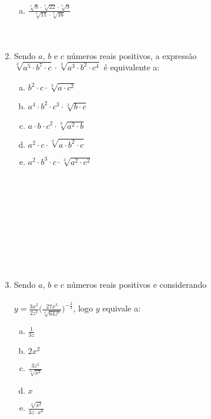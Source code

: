 \documentclass[a4paper,14pt]{article}
\begin{document}
\begin{multicols}{2}
\begin{enumerate}
\begin{enumerate}[a)]
        	\item $\frac{\sqrt[7]{8} \cdot \sqrt[7]{22} \cdot \sqrt[7]{9}}{\sqrt[7]{11} \cdot \sqrt[7]{16}}$\\\\\\
        \end{enumerate}
        \item Sendo $a$, $b$ e $c$ números reais positivos, a expressão\\ $\sqrt[3]{a^5 \cdot b^7 \cdot c} \cdot \sqrt[3]{a^3 \cdot b^2 \cdot c^4}$ é equivalente a:
        \begin{enumerate}[a)]
            \item $b^2 \cdot c \cdot \sqrt[3]{a \cdot c^2}$
            \item $a^4 \cdot b^2 \cdot c^3 \cdot \sqrt[3]{b \cdot c}$
            \item $a \cdot b \cdot c^2 \cdot \sqrt[3]{a^2 \cdot b}$
            \item $a^2 \cdot c \cdot \sqrt[3]{a \cdot b^2 \cdot c}$
            \item $a^2 \cdot b^3 \cdot c \cdot \sqrt[3]{a^2 \cdot c^2}$\\\\\\\\\\\\\\\\\\\\
        \end{enumerate}
        \item Sendo $a$, $b$ e $c$ números reais positivos e considerando \\\\$y = \frac{3x^2}{2z^2} \bigg(\frac{27x^3}{\sqrt[4]{64z^6}}\bigg)^{-\frac{2}{3}}$, logo $y$ equivale a:
        \begin{enumerate}[a)]
        	\item $\frac{1}{3z}$
        	\item $2x^2$
        	\item $\frac{3z^2}{\sqrt[4]{x^3}}$
        	\item $x$
        	\item $\frac{\sqrt[4]{x^2}}{3z \cdot x^6}$\\\\\\\\\\\\\\\\\\\\\\\\\\\\\\\\\\\\\

\end{enumerate}
\end{enumerate}
\end{multicols}
\end{document}

